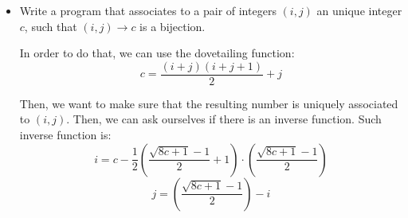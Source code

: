 \documentclass[]{scrartcl}
\begin{document}
\begin{itemize}
\item  Write a program that associates to a pair of integers $(i,j)$ an unique integer 
$c$, such that $(i,j)\to c$ is a bijection.

In order to do that, we can use the dovetailing function:
\[c = \frac{(i+j)(i+j+1)}{2} + j\]

Then, we want to make sure that the resulting number is uniquely associated to $(i,j)$. Then, we can ask ourselves if there is an inverse function. Such inverse function is:
\[i = c - \frac{1}{2}\left(\frac{\sqrt{8c+1}-1}{2} + 1\right) \cdot\left(\frac{\sqrt{8c+1}-1}{2}\right)\]
\[j = \left(\frac{\sqrt{8c+1}-1}{2}\right)-i\]
\end{itemize}
\end{document}
